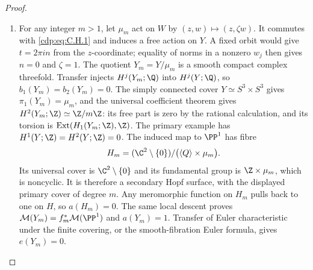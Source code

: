 \begin{proof}
\begin{enumerate}[label=\arabic*.,leftmargin=*]
\item For any integer $m>1$, let $\mu_m$ act on $W$ by
$(z,w)\mapsto(z,\zeta w)$. It commutes with \eqref{cdp:eq:C.H.1} and induces
a free action on $Y$. A fixed orbit would give $t=2\pi in$ from
the $z$-coordinate; equality of norms in a nonzero $w_j$ then
gives $n=0$ and $\zeta=1$. The quotient
$Y_m=Y/\mu_m$ is a smooth compact complex threefold. Transfer
injects $H^j(Y_m;\Q)$ into $H^j(Y;\Q)$, so $b_1(Y_m)=b_2(Y_m)=0$.
The simply connected cover $Y\simeq S^3\times S^3$ gives
$\pi_1(Y_m)=\mu_m$, and the universal coefficient theorem gives
$H^2(Y_m;\Z)\simeq\Z/m\Z$: its free part is zero by the
rational calculation, and its torsion is
$\operatorname{Ext}(H_1(Y_m;\Z),\Z)$. The primary
example has $H^1(Y;\Z)=H^2(Y;\Z)=0$.
The induced map to $\PP^1$ has fibre
\[
H_m=(\C^2\setminus\{0\})/
       \bigl(\langle Q\rangle\times\mu_m\bigr).
\]
Its universal cover is $\C^2\setminus\{0\}$ and its fundamental
group is $\Z\times\mu_m$, which is noncyclic. It is therefore a
secondary Hopf surface, with the displayed primary cover of degree
$m$. Any meromorphic function on $H_m$ pulls back to one on $H$,
so $a(H_m)=0$. The same local descent proves
$\mathcal M(Y_m)=f_m^*\mathcal M(\PP^1)$ and $a(Y_m)=1$.
Transfer of Euler characteristic under the finite covering,
or the smooth-fibration Euler formula, gives $e(Y_m)=0$.

\end{enumerate}
\end{proof}